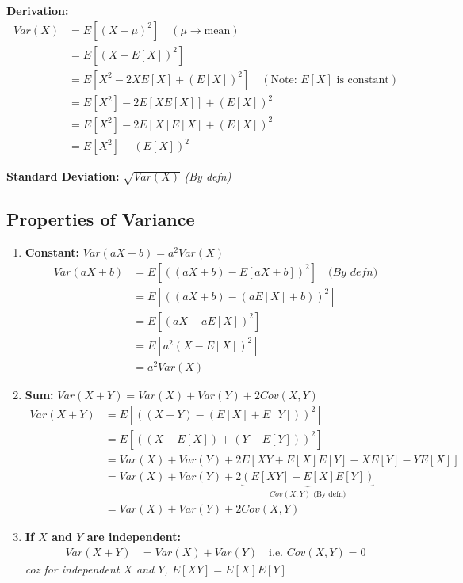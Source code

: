 \textbf{Derivation:}
\begin{align*}
    Var(X) &= E[(X-\mu)^2] \quad (\mu \rightarrow \text{mean}) \\
    &= E[(X - E[X])^2] \\
    &= E[X^2 - 2X E[X] + (E[X])^2] \quad (\text{Note: } E[X] \text{ is constant})\\
    &= E[X^2] - 2E[X E[X]] + (E[X])^2 \\
    &= E[X^2] - 2E[X]E[X] + (E[X])^2 \\
    &= E[X^2] - (E[X])^2
\end{align*}

\textbf{Standard Deviation:} $\sqrt{Var(X)}$ \quad \textit{(By defn)}

\subsection{Properties of Variance}
\begin{enumerate}
    \item \textbf{Constant:} $Var(aX+b) = a^2 Var(X)$
    \begin{align*}
        Var(aX+b) &= E[((aX+b) - E[aX+b])^2] \quad \textit{(By defn)} \\
        &= E[((aX+b) - (aE[X]+b))^2] \\
        &= E[(aX - aE[X])^2] \\
        &= E[a^2(X-E[X])^2] \\
        &= a^2 Var(X)
    \end{align*}
    
    \item \textbf{Sum:} $Var(X+Y) = Var(X) + Var(Y) + 2Cov(X,Y)$
    \begin{align*}
        Var(X+Y) &= E[((X+Y) - (E[X]+E[Y]))^2] \\
        &= E[((X-E[X]) + (Y-E[Y]))^2] \\
        &= Var(X) + Var(Y) + 2E[XY + E[X]E[Y] - XE[Y] - YE[X]] \\
        &= Var(X) + Var(Y) + 2\underbrace{(E[XY] - E[X]E[Y])}_{Cov(X,Y) \text{ (By defn)}} \\
        &= Var(X) + Var(Y) + 2Cov(X,Y)
    \end{align*}

    \item \textbf{If $X$ and $Y$ are independent:}
    \begin{align*}
        Var(X+Y) &= Var(X) + Var(Y) \quad \text{i.e. } Cov(X,Y) = 0
    \end{align*}
    \textit{coz for independent $X$ and $Y$, $E[XY] = E[X]E[Y]$}
\end{enumerate}

